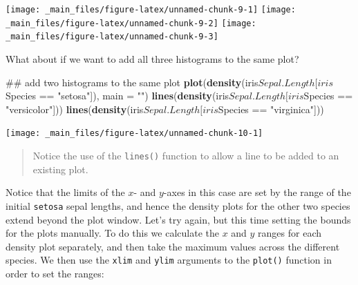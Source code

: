 \documentclass[]{book}
\newenvironment{Shaded}{\begin{snugshade}}{\end{snugshade}}
\newcommand{\KeywordTok}[1]{\textcolor[rgb]{0.13,0.29,0.53}{\textbf{{#1}}}}
\newcommand{\DataTypeTok}[1]{\textcolor[rgb]{0.13,0.29,0.53}{{#1}}}
\newcommand{\StringTok}[1]{\textcolor[rgb]{0.31,0.60,0.02}{{#1}}}
\newcommand{\NormalTok}[1]{{#1}}
\theoremstyle{definition}
\theoremstyle{definition}
\theoremstyle{definition}
\theoremstyle{remark}
\begin{document}
\begin{center}\texttt{[image: \_main\_files/figure-latex/unnamed-chunk-9-1]} \texttt{[image: \_main\_files/figure-latex/unnamed-chunk-9-2]} \texttt{[image: \_main\_files/figure-latex/unnamed-chunk-9-3]} \end{center}

What about if we want to add all three histograms to the same plot?

\begin{Shaded}
\begin{Highlighting}[]
\NormalTok{## add two histograms to the same plot}
\KeywordTok{plot}\NormalTok{(}\KeywordTok{density}\NormalTok{(iris$Sepal.Length[iris$Species ==}\StringTok{ "setosa"}\NormalTok{]), }\DataTypeTok{main =} \StringTok{""}\NormalTok{)}
\KeywordTok{lines}\NormalTok{(}\KeywordTok{density}\NormalTok{(iris$Sepal.Length[iris$Species ==}\StringTok{ "versicolor"}\NormalTok{]))}
\KeywordTok{lines}\NormalTok{(}\KeywordTok{density}\NormalTok{(iris$Sepal.Length[iris$Species ==}\StringTok{ "virginica"}\NormalTok{]))}
\end{Highlighting}
\end{Shaded}

\begin{center}\texttt{[image: \_main\_files/figure-latex/unnamed-chunk-10-1]} \end{center}

\begin{quote}
Notice the use of the \texttt{lines()} function to allow a line to be
added to an existing plot.
\end{quote}

Notice that the limits of the \(x\)- and \(y\)-axes in this case are set
by the range of the initial \texttt{setosa} sepal lengths, and hence the
density plots for the other two species extend beyond the plot window.
Let's try again, but this time setting the bounds for the plots
manually. To do this we calculate the \(x\) and \(y\) ranges for each
density plot separately, and then take the maximum values across the
different species. We then use the \texttt{xlim} and \texttt{ylim}
arguments to the \texttt{plot()} function in order to set the ranges:
\end{document}
